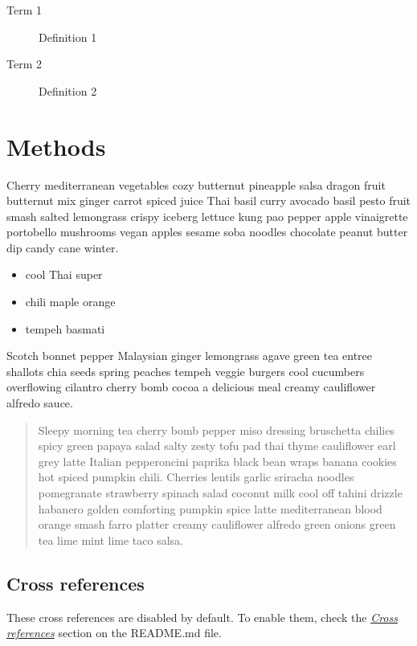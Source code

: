 \documentclass{book}
\providecommand{\tightlist}{%
  \setlength{\itemsep}{0pt}\setlength{\parskip}{0pt}}
\begin{document}
\begin{description}
\item[Term 1]
Definition 1
\item[Term 2]
Definition 2
\end{description}

\hypertarget{methods}{%
\section{Methods}\label{methods}}

Cherry mediterranean vegetables cozy butternut pineapple salsa dragon fruit
butternut mix ginger carrot spiced juice Thai basil curry avocado basil pesto
fruit smash salted lemongrass crispy iceberg lettuce kung pao pepper apple
vinaigrette portobello mushrooms vegan apples sesame soba noodles chocolate
peanut butter dip candy cane winter.

\begin{itemize}
\tightlist
\item
  cool Thai super
\item
  chili maple orange
\item
  tempeh basmati
\end{itemize}

Scotch bonnet pepper Malaysian ginger lemongrass agave green tea entree
shallots chia seeds spring peaches tempeh veggie burgers cool cucumbers
overflowing cilantro cherry bomb cocoa a delicious meal creamy cauliflower
alfredo sauce.

\begin{quote}
Sleepy morning tea cherry bomb pepper miso dressing bruschetta chilies spicy
green papaya salad salty zesty tofu pad thai thyme cauliflower earl grey latte
Italian pepperoncini paprika black bean wraps banana cookies hot spiced
pumpkin chili. Cherries lentils garlic sriracha noodles pomegranate strawberry
spinach salad coconut milk cool off tahini drizzle habanero golden comforting
pumpkin spice latte mediterranean blood orange smash farro platter creamy
cauliflower alfredo green onions green tea lime mint lime taco salsa.
\end{quote}

\hypertarget{cross-references}{%
\subsection{Cross references}\label{cross-references}}

These cross references are disabled by default. To enable them, check the
\emph{\href{https://github.com/wikiti/pandoc-book-template\#cross-references}{Cross
references}} section on the README.md file.
\end{document}
